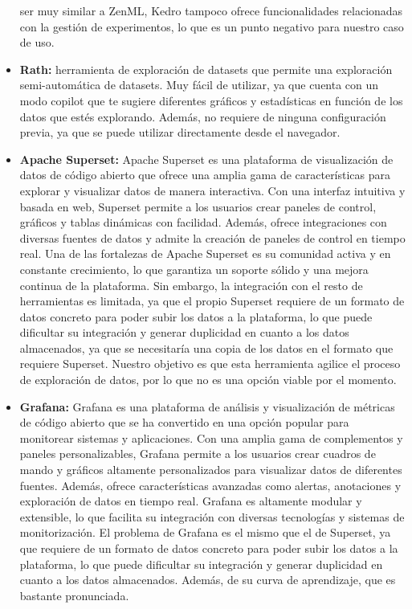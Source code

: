 \begin{itemize}
    ser muy similar a ZenML, Kedro tampoco ofrece funcionalidades relacionadas con la gestión de experimentos,
    lo que es un punto negativo para nuestro caso de uso. 
    \item \textbf{Rath:} herramienta de exploración de datasets que permite una exploración semi-automática
    de datasets. Muy fácil de utilizar, ya que cuenta con un modo copilot que te sugiere di\-fe\-ren\-tes gráficos
    y estadísticas en función de los datos que estés explorando. Además, no requiere de ninguna configuración
    previa, ya que se puede utilizar directamente desde el navegador.
    \item \textbf{Apache Superset:} Apache Superset es una plataforma de visualización de datos de código abierto 
    que ofrece una amplia gama de características para explorar y visualizar datos de manera interactiva. Con una 
    interfaz intuitiva y basada en web, Superset permite a los usuarios crear paneles de control, gráficos y tablas 
    dinámicas con facilidad. Además, ofrece integraciones con diversas fuentes de datos y admite la creación de 
    paneles de control en tiempo real. Una de las fortalezas de Apache Superset es su comunidad activa y en constante 
    crecimiento, lo que garantiza un soporte sólido y una mejora continua de la plataforma. Sin embargo, la integración
    con el resto de herramientas es limitada, ya que el propio Superset requiere de un formato de datos concreto para
    poder subir los datos a la plataforma, lo que puede dificultar su integración y generar duplicidad en cuanto a los
    datos almacenados, ya que se necesitaría una copia de los datos en el formato que requiere Superset. Nuestro objetivo
    es que esta herramienta agilice el proceso de exploración de datos, por lo que no es una opción viable por el momento.
    \item \textbf{Grafana:} Grafana es una plataforma de análisis y visualización de métricas de código abierto que 
    se ha convertido en una opción popular para monitorear sistemas y aplicaciones. Con una amplia gama de complementos 
    y paneles personalizables, Grafana permite a los usuarios crear cuadros de mando y gráficos altamente personalizados 
    para visualizar datos de diferentes fuentes. Además, ofrece características avanzadas como alertas, anotaciones y 
    exploración de datos en tiempo real. Grafana es altamente modular y extensible, lo que facilita su integración con 
    diversas tecnologías y sistemas de monitorización. El problema de Grafana es el mismo que el de Superset, ya que requiere
    de un formato de datos concreto para poder subir los datos a la plataforma, lo que puede dificultar su integración y
    generar duplicidad en cuanto a los datos almacenados. Además, de su curva de aprendizaje, que es bastante pronunciada.
\end{itemize}

